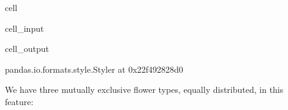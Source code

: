 \documentclass[letterpaper,10pt,english]{jupyterBook}
\begin{document}
\begin{sphinxuseclass}{cell}
\begin{sphinxVerbatimInput}
\begin{sphinxuseclass}{cell_input}
\begin{sphinxVerbatim}[commandchars=\\\{\}]
\end{sphinxVerbatim}

\end{sphinxuseclass}\end{sphinxVerbatimInput}
\begin{sphinxVerbatimOutput}

\begin{sphinxuseclass}{cell_output}
\begin{sphinxVerbatim}[commandchars=\\\{\}]
\PYGZlt{}pandas.io.formats.style.Styler at 0x22f492828d0\PYGZgt{}
\end{sphinxVerbatim}

\end{sphinxuseclass}\end{sphinxVerbatimOutput}

\end{sphinxuseclass}
\sphinxAtStartPar
We have three mutually exclusive flower types, equally distributed, in this feature:
\end{document}
